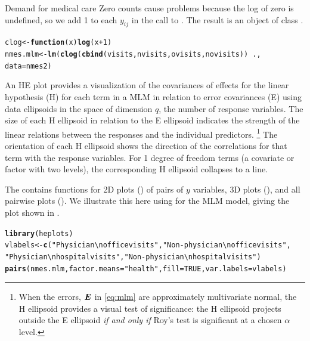 \documentclass[11pt]{book}\usepackage[]{graphicx}\usepackage[]{color}
\makeatletter
\newcommand{\hlnum}[1]{\textcolor[rgb]{0.686,0.059,0.569}{#1}}%
\newcommand{\hlstr}[1]{\textcolor[rgb]{0.192,0.494,0.8}{#1}}%
\newcommand{\hlopt}[1]{\textcolor[rgb]{0,0,0}{#1}}%
\newcommand{\hlstd}[1]{\textcolor[rgb]{0.345,0.345,0.345}{#1}}%
\newcommand{\hlkwa}[1]{\textcolor[rgb]{0.161,0.373,0.58}{\textbf{#1}}}%
\newcommand{\hlkwb}[1]{\textcolor[rgb]{0.69,0.353,0.396}{#1}}%
\newcommand{\hlkwc}[1]{\textcolor[rgb]{0.333,0.667,0.333}{#1}}%
\newcommand{\hlkwd}[1]{\textcolor[rgb]{0.737,0.353,0.396}{\textbf{#1}}}%
\newenvironment{kframe}{%
 \def\at@end@of@kframe{}%
 \ifinner\ifhmode%
  \def\at@end@of@kframe{\end{minipage}}%
  \begin{minipage}{\columnwidth}%
 \fi\fi%
 \def\FrameCommand##1{\hskip\@totalleftmargin \hskip-\fboxsep
 \colorbox{shadecolor}{##1}\hskip-\fboxsep
     \hskip-\linewidth \hskip-\@totalleftmargin \hskip\columnwidth}%
 \MakeFramed {\advance\hsize-\width
   \@totalleftmargin\z@ \linewidth\hsize
   \@setminipage}}%
 {\par\unskip\endMakeFramed%
 \at@end@of@kframe}
\newenvironment{knitrout}{}{} %
\renewenvironment{knitrout}{\small\renewcommand{\baselinestretch}{.85}}{} %
\makeatother
\begin{document}
\begin{Example}[nmes4]{Demand for medical care}
Zero counts cause problems because the log of zero is undefined, so we add 1 to each $y_{ij}$
in the call to .  The result is an object of class .
\begin{knitrout}
\color{fgcolor}\begin{kframe}
\begin{alltt}
\hlstd{clog} \hlkwb{<-} \hlkwa{function}\hlstd{(}\hlkwc{x}\hlstd{)} \hlkwd{log}\hlstd{(x}\hlopt{+}\hlnum{1}\hlstd{)}
\hlstd{nmes.mlm} \hlkwb{<-} \hlkwd{lm}\hlstd{(}\hlkwd{clog}\hlstd{(}\hlkwd{cbind}\hlstd{(visits, nvisits, ovisits, novisits))} \hlopt{~} \hlstd{.,}
               \hlkwc{data}\hlstd{=nmes2)}
\end{alltt}
\end{kframe}
\end{knitrout}

An HE plot provides a visualization of the covariances of effects for the linear hypothesis (H)
for each term in a MLM in relation to error covariances (E) using data ellipsoids in the
space of dimension $q$, the number of response variables.
The size of each H ellipsoid in relation to the E ellipsoid indicates the
strength of the linear relations between the responses and the individual predictors.%
\footnote{When the errors, $\bm{E}$ in \eqref{eq:mlm} are approximately multivariate normal,
the H ellipsoid provides a visual test of significance:  the H ellipsoid projects
outside the E ellipsoid \emph{if and only if} Roy's test is significant at a chosen $\alpha$ level.
}
The orientation of each H ellipsoid shows the direction of the correlations for that term
with the response variables.
For 1 degree of freedom terms (a covariate or factor with two levels), the corresponding
H ellipsoid collapses to a line.

The  contains functions for 2D plots () of pairs of $y$ variables,
3D plots (), and all pairwise plots ().  We illustrate this here
using  for the MLM model, giving the plot shown in .
\begin{knitrout}
\color{fgcolor}\begin{kframe}
\begin{alltt}
\hlkwd{library}\hlstd{(heplots)}
\hlstd{vlabels} \hlkwb{<-} \hlkwd{c}\hlstd{(}\hlstr{"Physician\textbackslash{}noffice visits"}\hlstd{,} \hlstr{"Non-physician\textbackslash{}n office visits"}\hlstd{,}
             \hlstr{"Physician\textbackslash{}nhospital visits"}\hlstd{,} \hlstr{"Non-physician\textbackslash{}nhospital visits"}\hlstd{)}
\hlkwd{pairs}\hlstd{(nmes.mlm,} \hlkwc{factor.means}\hlstd{=}\hlstr{"health"}\hlstd{,} \hlkwc{fill}\hlstd{=}\hlnum{TRUE}\hlstd{,} \hlkwc{var.labels}\hlstd{=vlabels)}
\end{alltt}
\end{kframe}\begin{figure}[!htbp]


\end{figure}
\end{knitrout}
\end{Example}
\end{document}
